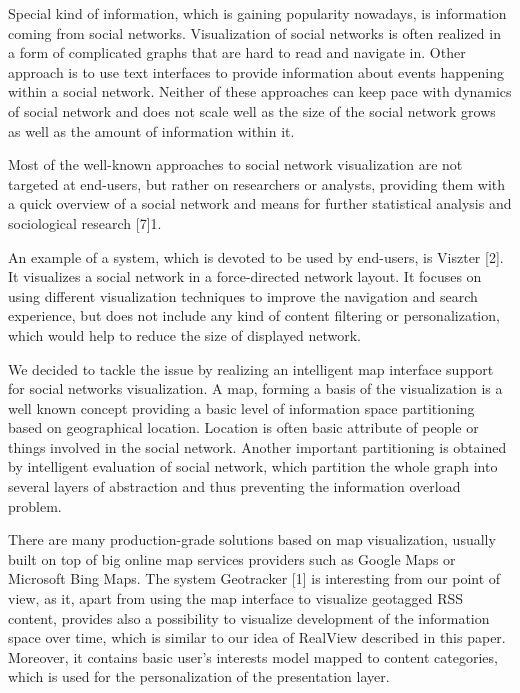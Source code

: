 \documentclass[10pt]{article}
\begin{document}
Special kind of information, which is gaining popularity nowadays, is information coming from social networks. Visualization of social networks is often realized in a form of complicated graphs that are hard to read and navigate in. Other approach is to use text interfaces to provide information about events happening within a social network. Neither of these approaches can keep pace with dynamics of social network and does not scale well as the size of the social network grows as well as the amount of information within it.

Most of the well-known approaches to social network visualization are not targeted at end-users, but rather on researchers or analysts, providing them with a quick
overview of a social network and means for further statistical analysis and sociological research [7]1.




An example of a system, which is devoted to be used by end-users, is Viszter [2]. It visualizes a social network in a force-directed network layout. It focuses on using different visualization techniques to improve the navigation and search experience, but does not include any kind of content filtering or personalization, which would help to reduce the size of displayed network.

We decided to tackle the issue by realizing an intelligent map interface support for social networks visualization. A map, forming a basis of the visualization is a well known concept providing a basic level of information space partitioning based on geographical location. Location is often basic attribute of people or things involved in the social network. Another important partitioning is obtained by intelligent evaluation of social network, which partition the whole graph into several layers of abstraction and thus preventing the information overload problem.

There are many production-grade solutions based on map visualization, usually built on top of big online map services providers such as Google Maps or Microsoft Bing Maps. The system Geotracker [1] is interesting from our point of view, as it, apart from using the map interface to visualize geotagged RSS content, provides also a possibility to visualize development of the information space over time, which is similar to our idea of RealView described in this paper. Moreover, it contains basic user’s interests model mapped to content categories, which is used for the personalization of the presentation layer.
\end{document}
